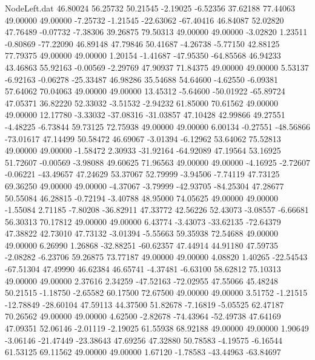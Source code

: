 \begin{filecontents}{NodeLeft.dat}
  46.80024   56.25732   50.21545    -2.19025   -6.52356   37.62188   77.44063   49.00000   49.00000   -7.25732   -1.21545  -22.63062  -67.40416
  46.84087   52.02820   47.76489    -0.07732   -7.38306   39.26875   79.50313   49.00000   49.00000   -3.02820    1.23511   -0.80869  -77.22090
  46.89148   47.79846   50.41687    -4.26738   -5.77150   42.88125   77.79375   49.00000   49.00000    1.20154   -1.41687  -47.95350  -64.85568
  46.94233   43.46863   55.92163    -0.00569   -2.29769   47.90937   71.84375   49.00000   49.00000    5.53137   -6.92163   -0.06278  -25.33487
  46.98286   35.54688   54.64600    -4.62550   -6.09381   57.64062   70.04063   49.00000   49.00000   13.45312   -5.64600  -50.01922  -65.89724
  47.05371   36.82220   52.33032    -3.51532   -2.94232   61.85000   70.61562   49.00000   49.00000   12.17780   -3.33032  -37.08316  -31.03857
  47.10428   42.99866   49.27551    -4.48225   -6.73844   59.73125   72.75938   49.00000   49.00000    6.00134   -0.27551  -48.56866  -73.01617
  47.14499   50.58472   46.69067    -3.01394   -6.12962   53.64062   75.52813   49.00000   49.00000   -1.58472    2.30933  -31.92164  -64.92089
  47.19564   53.16925   51.72607    -0.00569   -3.98088   49.60625   71.96563   49.00000   49.00000   -4.16925   -2.72607   -0.06221  -43.49657
  47.24629   53.37067   52.79999    -3.94506   -7.74119   47.73125   69.36250   49.00000   49.00000   -4.37067   -3.79999  -42.93705  -84.25304
  47.28677   50.55084   46.28815    -0.72194   -3.40788   48.95000   74.05625   49.00000   49.00000   -1.55084    2.71185   -7.80208  -36.82911
  47.33772   42.56226   52.43073    -3.08557   -6.66681   56.30313   70.17812   49.00000   49.00000    6.43774   -3.43073  -33.62135  -72.64379
  47.38822   42.73010   47.73132    -3.01394   -5.55663   59.35938   72.54688   49.00000   49.00000    6.26990    1.26868  -32.88251  -60.62357
  47.44914   44.91180   47.59735    -2.08282   -6.23706   59.26875   73.77187   49.00000   49.00000    4.08820    1.40265  -22.54543  -67.51304
  47.49990   46.62384   46.65741    -4.37481   -6.63100   58.62812   75.10313   49.00000   49.00000    2.37616    2.34259  -47.52163  -72.02955
  47.55066   45.48248   50.21515    -1.18750   -2.65582   60.17500   72.67500   49.00000   49.00000    3.51752   -1.21515  -12.78849  -28.60104
  47.59113   44.37500   51.82678    -7.16819   -5.05525   62.47187   70.26562   49.00000   49.00000    4.62500   -2.82678  -74.43964  -52.49738
  47.64169   47.09351   52.06146    -2.01119   -2.19025   61.55938   68.92188   49.00000   49.00000    1.90649   -3.06146  -21.47449  -23.38643
  47.69256   47.32880   50.78583    -4.19575   -6.16544   61.53125   69.11562   49.00000   49.00000    1.67120   -1.78583  -43.44963  -63.84697

\end{filecontents}
